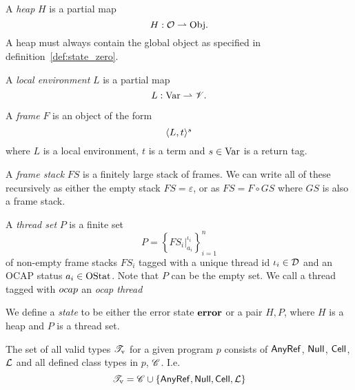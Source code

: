 \begin{definition}
  A \emph{heap} $H$ is a partial map
  \begin{equation*}
    H: \mathcal{O} \rightharpoonup \mathrm{Obj}.
  \end{equation*}
  A heap must always contain the global object as specified in
  definition~\ref{def:state_zero}.
\end{definition}

\begin{definition}
  A \emph{local environment} $L$ is a partial map
  \begin{equation*}
    L: \mathrm{Var} \rightharpoonup \mathscr{V}.
  \end{equation*}
\end{definition}

\begin{definition}\label{def:thread_sets}
  A \emph{frame} $F$ is an object of the form
  \begin{equation*}
    \mbox{$\langle L, t \rangle^s$}
  \end{equation*}
  where $L$ is a local environment, $t$ is a term and $s \in \mathrm{Var}$ is a
  return tag.

  A \emph{frame stack} $FS$ is a finitely large stack of frames. We can write
  all of these recursively as either the empty stack $FS = \varepsilon$, or as
  $FS = F \circ GS$ where $GS$ is also a frame stack.

  A \emph{thread set} $P$ is a finite set 
  \begin{equation*}
    P = \left\{ FS_i|_{a_i}^{\iota_i} \right\}_{i = 1}^{n}
  \end{equation*}
  of non-empty frame stacks $FS_i$ tagged with a unique thread id $\iota_i \in \mathcal{D}$ and an
  OCAP status $a_i \in \mathrm{OStat}$. Note that $P$ can be the empty set. We call
  a thread tagged with $\mbox{$ocap$}$ an \emph{ocap thread}
\end{definition}

\begin{definition}
  We define a \emph{state} to be either the error state $\mbox{{\bf error}}$ or a pair $H,
  P$, where $H$ is a heap and $P$ is a thread set.
\end{definition}

\begin{definition}
  The set of all valid types $\mathscr{T}_{\text{v}}$ for a given program $p$ consists of
  $\mbox{$\mathsf{AnyRef}$}$, $\mbox{$\mathsf{Null}$}$, $\mbox{$\mathsf{Cell}$}$, $\mbox{$\mathcal{L}$}$ and all defined
  class types in $p$, $\mathscr{C}$. I.e.
  \begin{equation*}
    \mathscr{T}_{\text{v}} = \mathscr{C} \cup \left\{ \mbox{$\mathsf{AnyRef}$}, \mbox{$\mathsf{Null}$}, \mbox{$\mathsf{Cell}$},
    \mbox{$\mathcal{L}$} \right\}
  \end{equation*}
\end{definition}

